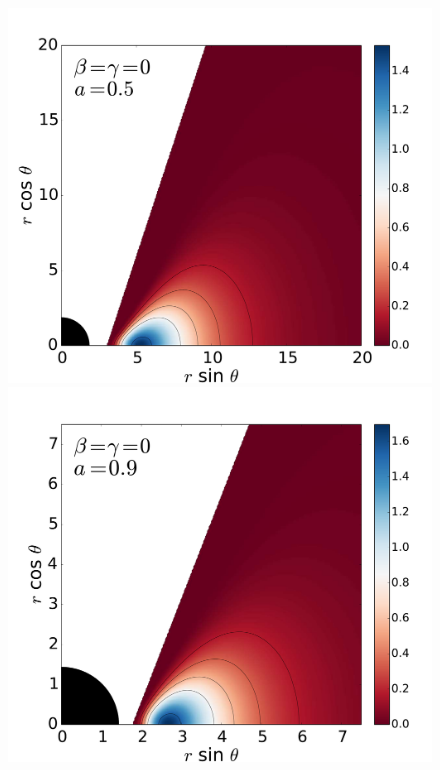 \documentclass{aa}
\begin{document}
\begin{figure}
\centering
\includegraphics[scale=0.14]{figures/fig2_1_1.pdf}
\hspace{-0.3cm}
\includegraphics[scale=0.14]{figures/fig2_1_2.pdf}
\hspace{-0.2cm}

\end{figure}
\end{document}
